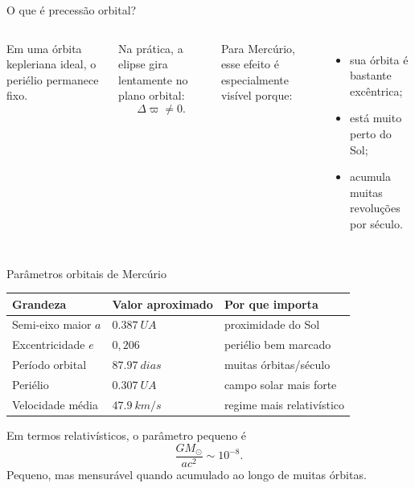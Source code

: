 \documentclass[aspectratio=169,10pt]{beamer}
\begin{document}
\begin{frame}{O que é precessão orbital?}
  \begin{columns}[T,onlytextwidth]
    Em uma órbita kepleriana ideal, o periélio permanece fixo.

    \vspace{0.4cm}
    Na prática, a elipse gira lentamente no plano orbital:
    \[
      \Delta\varpi \neq 0.
    \]

    \vspace{0.25cm}
    Para Mercúrio, esse efeito é especialmente visível porque:
    \begin{itemize}
      \item sua órbita é bastante excêntrica;
      \item está muito perto do Sol;
      \item acumula muitas revoluções por século.
    \end{itemize}

    \centering
  \end{columns}
\end{frame}

\begin{frame}{Parâmetros orbitais de Mercúrio}
  \begin{table}
    \centering
    \begin{tabular}{lll}
      \toprule
      Grandeza & Valor aproximado & Por que importa \\
      \midrule
      Semi-eixo maior $a$ & $\SI{0.387}{UA}$ & proximidade do Sol \\
      Excentricidade $e$ & $0{,}206$ & periélio bem marcado \\
      Período orbital & $\SI{87.97}{dias}$ & muitas órbitas/século \\
      Periélio & $\SI{0.307}{UA}$ & campo solar mais forte \\
      Velocidade média & $\SI{47.9}{km/s}$ & regime mais relativístico \\
      \bottomrule
    \end{tabular}
  \end{table}

  \vspace{0.35cm}
  Em termos relativísticos, o parâmetro pequeno é
  \[
    \frac{GM_\odot}{a c^2}\sim 10^{-8}.
  \]
  Pequeno, mas mensurável quando acumulado ao longo de muitas órbitas.
\end{frame}
\end{document}
